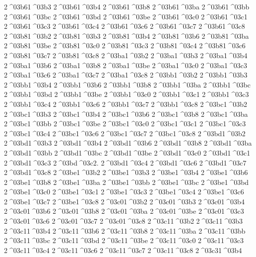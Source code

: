 {2^^^^03b61^^^^03b3
2^^^^03b61^^^^03b4
2^^^^03b61^^^^03b8
2^^^^03b61^^^^03ba
2^^^^03b61^^^^03bb
2^^^^03b61^^^^03bc
2^^^^03b61^^^^03bd
2^^^^03b61^^^^03be
2^^^^03b61^^^^03c0
2^^^^03b61^^^^03c1
2^^^^03b61^^^^03c3
2^^^^03b61^^^^03c4
2^^^^03b61^^^^03c6
2^^^^03b61^^^^03c7
2^^^^03b61^^^^03c8
%
2^^^^03b81^^^^03b2
2^^^^03b81^^^^03b3
2^^^^03b81^^^^03b4
2^^^^03b81^^^^03b6
2^^^^03b81^^^^03ba
2^^^^03b81^^^^03be
2^^^^03b81^^^^03c0
2^^^^03b81^^^^03c3
2^^^^03b81^^^^03c4
2^^^^03b81^^^^03c6
2^^^^03b81^^^^03c7
2^^^^03b81^^^^03c8
%
2^^^^03ba1^^^^03b2
2^^^^03ba1^^^^03b3
2^^^^03ba1^^^^03b4
2^^^^03ba1^^^^03b6
2^^^^03ba1^^^^03b8
2^^^^03ba1^^^^03be
2^^^^03ba1^^^^03c0
2^^^^03ba1^^^^03c3
2^^^^03ba1^^^^03c6
2^^^^03ba1^^^^03c7
2^^^^03ba1^^^^03c8
%
2^^^^03bb1^^^^03b2
2^^^^03bb1^^^^03b3
2^^^^03bb1^^^^03b4
2^^^^03bb1^^^^03b6
2^^^^03bb1^^^^03b8
2^^^^03bb1^^^^03ba
2^^^^03bb1^^^^03bc
2^^^^03bb1^^^^03bd
2^^^^03bb1^^^^03be
2^^^^03bb1^^^^03c0
2^^^^03bb1^^^^03c1
2^^^^03bb1^^^^03c3
2^^^^03bb1^^^^03c4
2^^^^03bb1^^^^03c6
2^^^^03bb1^^^^03c7
2^^^^03bb1^^^^03c8
%
2^^^^03bc1^^^^03b2
2^^^^03bc1^^^^03b3
2^^^^03bc1^^^^03b4
2^^^^03bc1^^^^03b6
2^^^^03bc1^^^^03b8
2^^^^03bc1^^^^03ba
2^^^^03bc1^^^^03bb
2^^^^03bc1^^^^03be
2^^^^03bc1^^^^03c0
2^^^^03bc1^^^^03c1
2^^^^03bc1^^^^03c3
2^^^^03bc1^^^^03c4
2^^^^03bc1^^^^03c6
2^^^^03bc1^^^^03c7
2^^^^03bc1^^^^03c8
%
2^^^^03bd1^^^^03b2
2^^^^03bd1^^^^03b3
2^^^^03bd1^^^^03b4
2^^^^03bd1^^^^03b6
2^^^^03bd1^^^^03b8
2^^^^03bd1^^^^03ba
2^^^^03bd1^^^^03bb
2^^^^03bd1^^^^03bc
2^^^^03bd1^^^^03be
2^^^^03bd1^^^^03c0
2^^^^03bd1^^^^03c1
2^^^^03bd1^^^^03c3
2^^^^03bd^^^^03c2.
2^^^^03bd1^^^^03c4
2^^^^03bd1^^^^03c6
2^^^^03bd1^^^^03c7
2^^^^03bd1^^^^03c8
%
2^^^^03be1^^^^03b2
2^^^^03be1^^^^03b3
2^^^^03be1^^^^03b4
2^^^^03be1^^^^03b6
2^^^^03be1^^^^03b8
2^^^^03be1^^^^03ba
2^^^^03be1^^^^03bb
2^^^^03be1^^^^03bc
2^^^^03be1^^^^03bd
2^^^^03be1^^^^03c0
2^^^^03be1^^^^03c1
2^^^^03be1^^^^03c3
2^^^^03be1^^^^03c4
2^^^^03be1^^^^03c6
2^^^^03be1^^^^03c7
2^^^^03be1^^^^03c8
%
2^^^^03c01^^^^03b2
2^^^^03c01^^^^03b3
2^^^^03c01^^^^03b4
2^^^^03c01^^^^03b6
2^^^^03c01^^^^03b8
2^^^^03c01^^^^03ba
2^^^^03c01^^^^03be
2^^^^03c01^^^^03c3
2^^^^03c01^^^^03c6
2^^^^03c01^^^^03c7
2^^^^03c01^^^^03c8
%
2^^^^03c11^^^^03b2
2^^^^03c11^^^^03b3
2^^^^03c11^^^^03b4
2^^^^03c11^^^^03b6
2^^^^03c11^^^^03b8
2^^^^03c11^^^^03ba
2^^^^03c11^^^^03bb
2^^^^03c11^^^^03bc
2^^^^03c11^^^^03bd
2^^^^03c11^^^^03be
2^^^^03c11^^^^03c0
2^^^^03c11^^^^03c3
2^^^^03c11^^^^03c4
2^^^^03c11^^^^03c6
2^^^^03c11^^^^03c7
2^^^^03c11^^^^03c8
%
2^^^^03c31^^^^03b4   %
}
